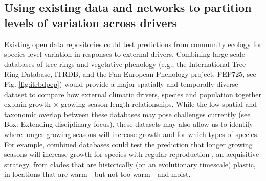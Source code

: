 \documentclass[11pt]{article}
\begin{document}
\subsection*{Using existing data and networks to partition levels of variation across drivers}

Existing open data repositories could test predictions from community ecology for species-level variation in responses to external drivers. Combining large-scale databases of tree rings and vegetative phenology (e.g., the International Tree Ring Database, ITRDB, and the Pan European Phenology project, PEP725, see Fig. \ref{fig:itrbdpep}) would provide a major spatially and temporally diverse dataset to compare how external climatic drivers, species and population together explain growth $\times$ growing season length relationships. While the low spatial and taxonomic overlap between these databases may pose challenges currently (see Box: Extending disciplinary focus), these datasets may also allow us to identify  where longer growing seasons will increase growth and for which types of species. For example, combined databases could test the prediction that longer growing seasons will increase growth for species with regular reproduction \citep[no masting, see also new masting database in][]{hacket2022mastree+}, an acquisitive strategy, from clades that are historically (on an evolutionary timescale) plastic, in locations that are warm---but not too warm---and moist. 

\end{document}
